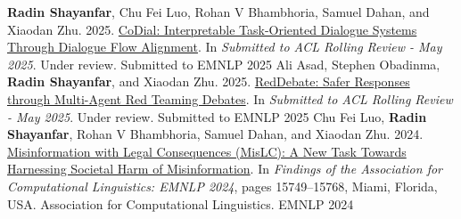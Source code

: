 
\begin{cvhonors}

  \cvpub
    {\textbf{Radin Shayanfar}, Chu Fei Luo, Rohan V Bhambhoria, Samuel Dahan, and Xiaodan Zhu. 2025. \href{https://arxiv.org/abs/2506.02264}{CoDial: Interpretable Task-Oriented Dialogue Systems Through Dialogue Flow Alignment}. In \textit{Submitted to ACL Rolling Review - May 2025}. Under review.} %
    {Submitted to EMNLP} %
    {2025} %
  \cvpub
    {Ali Asad, Stephen Obadinma, \textbf{Radin Shayanfar}, and Xiaodan Zhu. 2025. \href{https://arxiv.org/abs/2506.11083}{RedDebate: Safer Responses through Multi-Agent Red Teaming Debates}. In \textit{Submitted to ACL Rolling Review - May 2025}. Under review.} %
    {Submitted to EMNLP} %
    {2025} %
  \cvpub
    {Chu Fei Luo, \textbf{Radin Shayanfar}, Rohan V Bhambhoria, Samuel Dahan, and Xiaodan Zhu. 2024. \href{https://aclanthology.org/2024.findings-emnlp.924/}{Misinformation with Legal Consequences (MisLC): A New Task Towards Harnessing Societal Harm of Misinformation}. In \textit{Findings of the Association for Computational Linguistics: EMNLP 2024}, pages 15749–15768, Miami, Florida, USA. Association for Computational Linguistics.} %
    {EMNLP} %
    {2024} %
\end{cvhonors}





